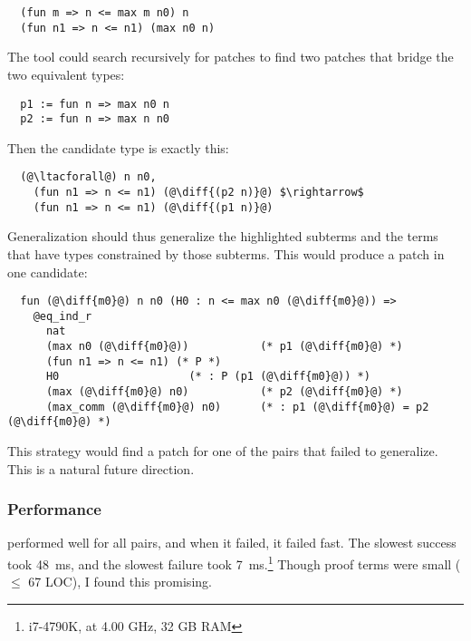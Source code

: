 \begin{lstlisting}
  (fun m => n <= max m n0) n
  (fun n1 => n <= n1) (max n0 n)
\end{lstlisting}
The tool could search recursively for patches to find two patches that bridge the two equivalent
types:

\begin{lstlisting}
  p1 := fun n => max n0 n
  p2 := fun n => max n n0
\end{lstlisting}
Then the candidate type is exactly this:

\begin{lstlisting}
  (@\ltacforall@) n n0,
    (fun n1 => n <= n1) (@\diff{(p2 n)}@) $\rightarrow$
    (fun n1 => n <= n1) (@\diff{(p1 n)}@)
\end{lstlisting}
Generalization should thus generalize the highlighted subterms and the
terms that have types constrained by those subterms.
This would produce a patch in one candidate:

\begin{lstlisting}
  fun (@\diff{m0}@) n n0 (H0 : n <= max n0 (@\diff{m0}@)) =>
    @eq_ind_r
      nat
      (max n0 (@\diff{m0}@))           (* p1 (@\diff{m0}@) *)
      (fun n1 => n <= n1) (* P *)
      H0                    (* : P (p1 (@\diff{m0}@)) *)
      (max (@\diff{m0}@) n0)           (* p2 (@\diff{m0}@) *)
      (max_comm (@\diff{m0}@) n0)      (* : p1 (@\diff{m0}@) = p2 (@\diff{m0}@) *)
\end{lstlisting}
This strategy would find a patch for one of the pairs that \sysname failed to generalize.
This is a natural future direction.

\subsubsection{Performance}
\label{sec:perf}

\sysname performed well for all pairs, and when it failed, it failed fast.
The slowest success took \SI{48}{\ms},
and the slowest failure took \SI{7}{\ms}.\footnote{i7-4790K, at 4.00 GHz, 32 GB RAM}
Though proof terms were small ($\le$ 67 LOC), I found this promising.



